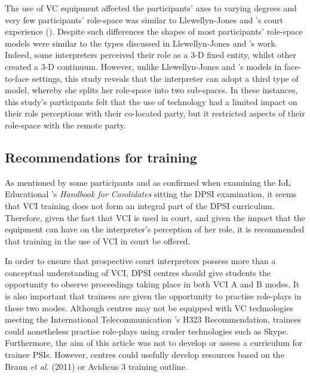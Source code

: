 \documentclass[output=paper]{langsci/langscibook}
\begin{document}
The use of VC equipment affected the participants’ axes to varying degrees and very few participants’ role-space was similar to Llewellyn-Jones and \citet{Lee2014}’s court experience (). Despite such differences the shapes of most participants’ role-space models were similar to the types discussed in Llewellyn-Jones and \citet{Lee2014}’s work. Indeed, some interpreters perceived their role as a 3-D fixed entity, whilst other created a 3-D continuum. However, unlike Llewellyn-Jones and \citet{Lee2014}’s models in face-to-face settings, this study reveals that the interpreter can adopt a third type of model, whereby she splits her role-space into two sub-spaces. In these instances, this study’s participants felt that the use of technology had a limited impact on their role perceptions with their co-located party, but it restricted aspects of their role-space with the remote party. 

\subsection{Recommendations for training}
As mentioned by some participants and as confirmed when examining the IoL Educational \citet{Trust2015}’s \textit{Handbook for Candidates} sitting the DPSI examination, it seems that VCI training does not form an integral part of the DPSI curriculum. Therefore, given the fact that VCI is used in court, and given the impact that the equipment can have on the interpreter’s perception of her role, it is recommended that training in the use of VCI in court be offered.  

In order to ensure that prospective court interpreters possess more than a conceptual understanding of VCI, DPSI centres should give students the opportunity to observe proceedings taking place in both VCI A and B modes. It is also important that trainees are given the opportunity to practise role-plays in these two modes. Although centres may not be equipped with VC technologies meeting the International Telecommunication \citet{Union2009}’s H323 Recommendation, trainees could nonetheless practise role-plays using cruder technologies such as Skype. Furthermore, the aim of this article was not to develop or assess a curriculum for trainee PSIs. However, centres could usefully develop resources based on the Braun \textit{et al.} (2011) or Avidicus 3 training outline. 
\end{document}
